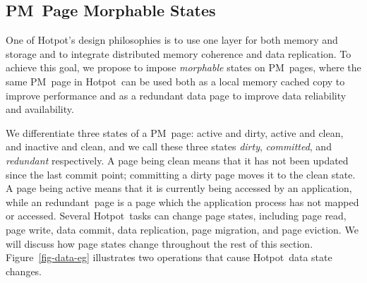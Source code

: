\documentclass[sigconf]{acmart}
\renewcommand{\em}{\it}
\newcommand{\nvm}{PM}
\newcommand{\hotpot}{Hotpot}
\newcommand{\dirty}{dirty}
\newcommand{\committed}{committed}
\newcommand{\redundant}{redundant}
\providecommand{\DIFaddbegin}{} %
\providecommand{\DIFaddend}{} %
\providecommand{\DIFdelend}{} %
\begin{document}
{%
\DIFdelend \DIFaddbegin \subsection{\nvm\ Page Morphable States}
\DIFaddend One of \hotpot's design philosophies is to use one layer for both memory and storage 
and to integrate distributed memory coherence and data replication.
To achieve this goal, we propose to impose {\em morphable} states on \nvm\ pages,
where the same \nvm\ page in \hotpot\ can be used both as a local memory cached copy to improve performance
and as a redundant data page to improve data reliability and availability.

We differentiate three states of a \nvm\ page:
active and dirty, active and clean, and inactive and clean,
and we call these three states {\em \dirty}, {\em \committed}, and {\em \redundant} respectively.
A page being clean means that it has not been updated since the last commit point;
committing a dirty page moves it to the clean state.
A page being active means that it is currently being accessed by an application,
while an \redundant\ page is a page which the application process has not mapped or accessed.
Several \hotpot\ tasks can change page states,
including page read, page write, data commit, data replication, page migration, and page eviction.
We will discuss how page states change throughout the rest of this section.
Figure~\ref{fig-data-eg} illustrates two operations that cause \hotpot\ data state changes.

}
\end{document}
